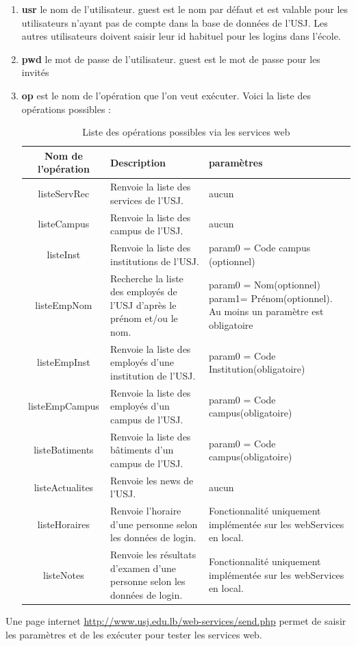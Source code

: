 	\begin{enumerate}
	\item \textbf{usr} le nom de l'utilisateur. guest est le nom par défaut et est valable pour les utilisateurs n'ayant pas de compte dans la base de données de l'USJ. Les autres utilisateurs doivent saisir leur id habituel pour les logins dans l'école. 
	\item \textbf{pwd} le mot de passe de l'utilisateur. guest est le mot de passe pour les invités
	\item \textbf{op} est le nom de l'opération que l'on veut exécuter. Voici la liste des opérations possibles : 
	\begin{table}[H]
	\centering
	\begin{tabular}{|c|p{4cm}|p{7cm}|}
	\hline \textbf{Nom de l'opération }& \textbf{Description} & \textbf{paramètres}  \\ 
	\hline listeServRec & Renvoie la liste des services de l'USJ. & aucun \\ 
	\hline listeCampus & Renvoie la liste des campus de l'USJ. & aucun \\ 
	\hline listeInst & Renvoie la liste des institutions de l'USJ. & param0 = Code campus (optionnel) \\ 
	\hline listeEmpNom & Recherche la liste des employés de l'USJ d'après le prénom et/ou le nom. & param0 = Nom(optionnel)  param1= Prénom(optionnel). Au moins un paramètre est obligatoire  \\ 
	\hline listeEmpInst & Renvoie la liste des employés d'une institution de l'USJ. & param0 = Code Institution(obligatoire)   \\
	\hline listeEmpCampus & Renvoie la liste des employés d'un campus de l'USJ. & param0 = Code campus(obligatoire)  \\
	\hline listeBatiments & Renvoie la liste des bâtiments d'un campus de l'USJ. & param0 = Code campus(obligatoire)  \\
	\hline listeActualites & Renvoie les news de l'USJ. &aucun  \\
	\hline \color{red}listeHoraires & \color{red}Renvoie l'horaire d'une personne selon les données de login. & \color{red} Fonctionnalité uniquement implémentée sur les webServices en local.  \\
	\hline \color{red}listeNotes & \color{red}Renvoie les résultats d'examen d'une personne selon les données de login. & \color{red} Fonctionnalité uniquement implémentée sur les webServices en local.  \\
	\hline 
	\end{tabular} 
		\caption{Liste des opérations possibles via les services web}
	\end{table}
	\end{enumerate}
	Une page internet \url{http://www.usj.edu.lb/web-services/send.php} permet de saisir les paramètres et de les exécuter pour tester les services web.
	
